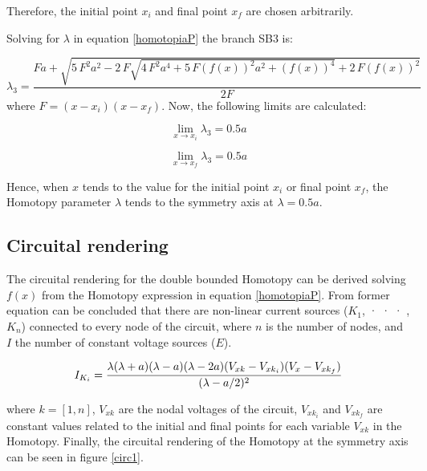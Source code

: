 \documentclass[conference,letterpaper,onecolumn]{IEEEtran}
\begin{document}
{Therefore, the initial point $x_i$ and final point $x_f$ are chosen arbitrarily.

Solving for $\lambda$ in equation \ref{homotopiaP} the branch SB3 is:

{
\begin{displaymath}
\lambda_3= {\frac {Fa+\sqrt {5\,{F}^{2}{a}^{2}-2\,F\sqrt { 4\,{F}^{2}{a}^
{4}+5\,F \left( f \left( x \right)  \right) ^{2}{a}^{2}+ \left( f
 \left( x \right)  \right) ^{4}}+2\,F \left( f \left( x \right) 
 \right) ^{2}}}{2F}}
\end{displaymath}
}
where $F=(x-x_i)(x-x_f)$. Now, the following limits are calculated:

\begin{equation}
 \displaystyle\lim_{x \to{x_i}}{\lambda_3}=0.5a 
 \label{demos1}
\end{equation}

\begin{equation}
  \displaystyle\lim_{x \to{x_f}}{\lambda_3}=0.5a
 \label{demos2}
\end{equation}

Hence, when $x$ tends to the value for the initial point $x_i$ or final point $x_f$, the Homotopy parameter $\lambda$ tends to the symmetry axis at $\lambda=0.5a$.

\subsection{Circuital rendering}

The circuital rendering for the double bounded Homotopy can be derived solving $f(x)$ from the Homotopy expression in equation \ref{homotopiaP}. From former equation can be concluded that there are non-linear current sources ($K_1$, · · · ,$K_n$) connected to every node of the circuit, where $n$ is the number of nodes, and $I$ the number of constant voltage sources ($E$).

\begin{equation}
I_{K_i}={\lambda(\lambda+a)(\lambda-a)(\lambda-2a)(V_{xk}-V_{{xk}_i})(V_x-V_{xk_f}) \over (\lambda-a/2)^2}
\label{Ikn}
\end{equation}

where $k=[1,n]$,  $V_{xk}$ are the nodal voltages of the circuit, $V_{{xk}_i}$ and $V_{{xk}_f}$ are constant values related to the initial and final points for each variable $V_{xk}$ in the Homotopy. Finally, the circuital rendering of the Homotopy at the symmetry axis can be seen in figure \ref{circ1}.

}
\end{document}
